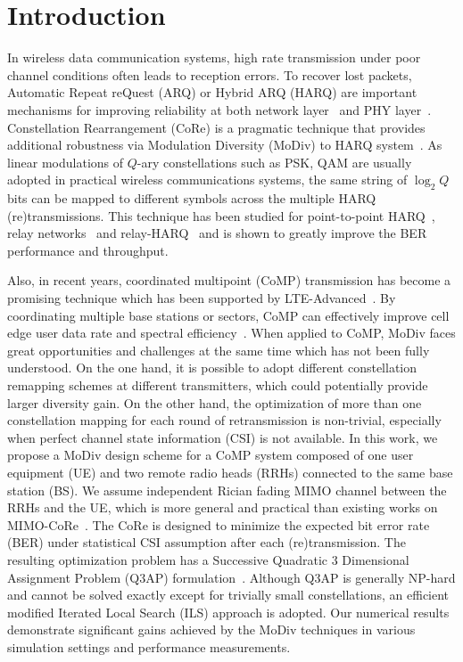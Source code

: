 \documentclass[journal]{IEEEtran}
\begin{document}
\section{Introduction}
\label{sec:intro}

In wireless data communication systems, high rate transmission under poor
channel conditions often leads to reception errors. To recover lost packets,
Automatic Repeat reQuest (ARQ) or Hybrid ARQ (HARQ) are important mechanisms for
improving reliability at both network layer~\cite{TS36.331} and PHY
layer~\cite{TS36.213}. Constellation Rearrangement (CoRe) is a pragmatic
technique that provides additional robustness via Modulation Diversity (MoDiv)
to HARQ system~\cite{benelli1992new}.
As linear modulations of $Q$-ary constellations such as PSK, QAM are usually
adopted in practical wireless communications systems, the same string of
$\log_2Q$ bits can be mapped to different symbols across the multiple HARQ
(re)transmissions. This technique has been studied for point-to-point
HARQ~\cite{samra2005symbol}, relay
networks~\cite{seddik2008trans, khormuji2008rate} and
relay-HARQ~\cite{kim2009design, ryu2011ber, wu2016modulation} and is shown to
greatly improve the BER performance and throughput.

Also, in recent years, coordinated multipoint (CoMP) transmission has become a
promising technique which has been supported by
LTE-Advanced~\cite{sawahashi2010coordinated}. By coordinating multiple base
stations or sectors, CoMP can effectively improve cell edge user data rate and
spectral efficiency~\cite{irmer2011coordinated}. When applied to CoMP, MoDiv
faces great opportunities and challenges at the same time which has not been fully
understood. On the one hand,
it is possible to adopt different constellation remapping schemes at different
transmitters, which could potentially provide larger diversity gain. On the
other hand, the optimization of more than one constellation mapping for each
round of retransmission is non-trivial, especially when perfect channel state
information (CSI) is not available.
In this work, we propose a MoDiv design scheme for a CoMP system composed of one
user equipment (UE) and two remote radio heads (RRHs) connected to the same
base station (BS). We assume independent Rician fading MIMO
channel between the RRHs and the UE, which is more general and practical than
existing works on MIMO-CoRe~\cite{bahadori2014performance, zhao2009harq}.
The CoRe is designed to minimize the expected bit error rate (BER) under
statistical CSI assumption after each (re)transmission. The resulting
optimization problem has a Successive Quadratic 3 Dimensional Assignment Problem
(Q3AP) formulation~\cite{hahn2008quadratic}. Although Q3AP is generally NP-hard and
cannot be solved exactly except for trivially small constellations, an
efficient modified Iterated Local Search (ILS) approach is adopted. Our
numerical results demonstrate significant gains achieved by the MoDiv techniques
in various simulation settings and performance measurements.
\end{document}
